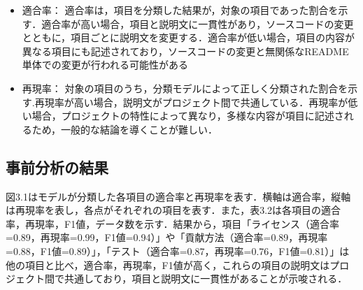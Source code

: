 \documentclass[submit]{ipsj}
\begin{document}



\begin{itemize}
  \item 適合率： 適合率は，項目を分類した結果が，対象の項目であった割合を示す．適合率が高い場合，項目と説明文に一貫性があり，ソースコードの変更とともに，項目ごとに説明文を変更する．適合率が低い場合，項目の内容が異なる項目にも記述されており，ソースコードの変更と無関係なREADME単体での変更が行われる可能性がある
  \item 再現率： 対象の項目のうち，分類モデルによって正しく分類された割合を示す.再現率が高い場合，説明文がプロジェクト間で共通している．再現率が低い場合，プロジェクトの特性によって異なり，多様な内容が項目に記述されるため，一般的な結論を導くことが難しい．
\end{itemize}





\subsection{事前分析の結果}
図3.1はモデルが分類した各項目の適合率と再現率を表す．横軸は適合率，縦軸は再現率を表し，各点がそれぞれの項目を表す．また，表3.2は各項目の適合率，再現率，F1値，データ数を示す．結果から，項目「ライセンス（適合率=0.89，再現率=0.99，F1値=0.94）」や「貢献方法（適合率=0.89，再現率=0.88，F1値=0.89）」，「テスト（適合率=0.87，再現率=0.76，F1値=0.81）」は他の項目と比べ，適合率，再現率，F1値が高く，これらの項目の説明文はプロジェクト間で共通しており，項目と説明文に一貫性があることが示唆される．
\end{document}
